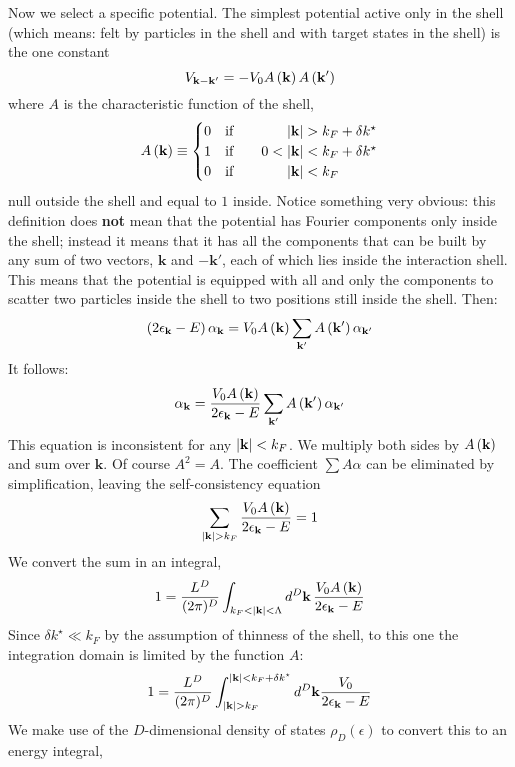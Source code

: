 Now we select a specific potential. The simplest potential active only in the shell (which means: felt by particles in the shell and with target states in the shell) is the one constant
\[
	V_{\mathbf{k}-\mathbf{k}'} = - V_0 A\left({\mathbf{k}}\right) A\left({\mathbf{k}'}\right)
\]
where $A$ is the characteristic function of the shell,
\[
	A\lrR{\mathbf{k}} \equiv \begin{cases}
		0 \qq{if} &\hphantom{0<{}}\abs{\mathbf{k}} > k_F + \delta k^\star \\
		1 \qq{if} &0<\abs{\mathbf{k}} < k_F + \delta k^\star \\
		0 \qq{if} &\hphantom{0<{}}\abs{\mathbf{k}} < k_F
	\end{cases}
\]
null outside the shell and equal to $1$ inside. Notice something very obvious: this definition does \textbf{not} mean that the potential has Fourier components only inside the shell; instead it means that it has all the components that can be built by any sum of two vectors, $\mathbf{k}$ and $-\mathbf{k}'$, each of which lies inside the interaction shell. This means that the potential is equipped with all and only the components to scatter two particles inside the shell to two positions still inside the shell. Then:
\[
	\left({2 \epsilon_\mathbf{k} - E}\right) \alpha_\mathbf{k} = V_0 A\left({\mathbf{k}}\right) \sum_{\mathbf{k}'} A\left({\mathbf{k}'}\right) \alpha_{\mathbf{k}'}
\]
It follows:
\begin{equation}\label{eq:bound states with statistics intermediate passage, for inconsistency comment}
	\alpha_\mathbf{k} = \frac{V_0 A\left({\mathbf{k}}\right)}{2 \epsilon_\mathbf{k} - E} \sum_{\mathbf{k}'} A\left({\mathbf{k}'}\right) \alpha_{\mathbf{k}'}
\end{equation}
This equation is inconsistent for any $\abs{\mathbf{k}}<k_F$.
We multiply both sides by $A\left({\mathbf{k}}\right)$ and sum over $\mathbf{k}$. Of course $A^2 = A$. The coefficient $\sum A \alpha$ can be eliminated by simplification, leaving the self-consistency equation
\[
	\sum_{\abs{\mathbf{k}}>k_F} \frac{V_0 A\left({\mathbf{k}}\right)}{2 \epsilon_\mathbf{k} - E} = 1
\]
We convert the sum in an integral,
\[
	1 = \frac{L^D}{(2\pi)^D} \int_{k_F<\abs{\mathbf{k}}<\Lambda} d^D \mathbf{k} \, \frac{V_0 A\left({\mathbf{k}}\right)}{2 \epsilon_\mathbf{k} - E}
\]
Since $\delta k^\star \ll k_F$ by the assumption of thinness of the shell, to this one the integration domain is limited by the function $A$:
\[
	1 = \frac{L^D}{(2\pi)^D} \int_{\abs{\mathbf{k}} > k_F}^{\abs{\mathbf{k}} < k_F+\delta k^\star} d^D \mathbf{k} \frac{V_0}{2 \epsilon_\mathbf{k} - E}
\]
We make use of the $D$-dimensional density of states $\rho_D(\epsilon)$ to convert this to an energy integral,
